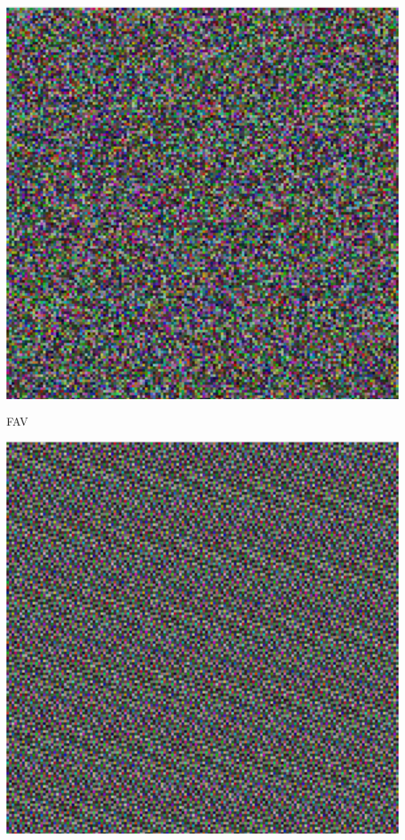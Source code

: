\documentclass[
    aspectratio=169,
]{beamer}
\begin{document}
\begin{frame}[t,fragile]
\begin{minipage}[t]{0.65\textwidth}
        \vspace{1.5em}
        
        \begin{minipage}[b]{0.25\textwidth}
            \centering
            \includegraphics[width=0.97\textwidth]{image/permutation-fav.png}
            \par FAV
        \end{minipage}%
        \begin{minipage}[b]{0.25\textwidth}
            \centering
            \includegraphics[width=0.97\textwidth]{image/permutation-mp1.png}

\end{minipage}
\end{minipage}
\end{frame}
\end{document}
